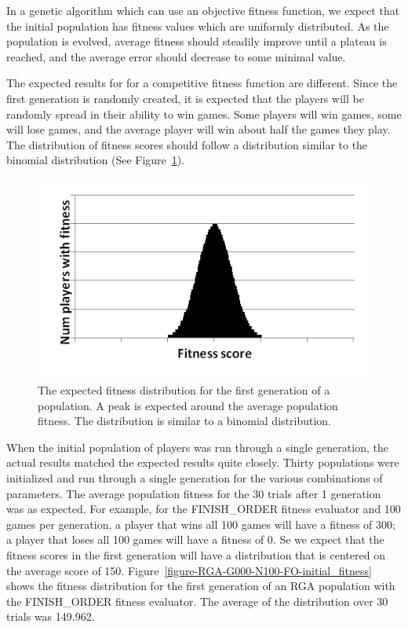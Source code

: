 In a genetic algorithm which can use an objective fitness function, we expect
that the initial population has fitness values which are uniformly distributed.
As the population is evolved, average fitness should steadily improve until a
plateau is reached, and the average error should decrease to some minimal
value.

The expected results for for a competitive fitness function are different. Since
the first generation is randomly created, it is expected that the players will
be randomly spread in their ability to win games. Some players will win games,
some will lose games, and the average player will win about half the games they
play. The distribution of fitness scores should follow a distribution similar to
the binomial distribution (See Figure~\ref{figure-binomial}).

\begin{figure}[htp]
\centerline{\includegraphics[width=1.0\columnwidth]{Figures/binomial.png}}
\caption[Binomial Distribution]{The expected fitness distribution for the first
generation of a population. A peak is expected around the average population
fitness. The distribution is similar to a binomial distribution.}
\label{figure-binomial}
\end{figure}

When the initial population of players was run through a single generation, the
actual results matched the expected results quite closely. Thirty populations
were initialized and run through a single generation for the various
combinations of parameters. The average population fitness for the 30 trials
after 1 generation was as expected. For example, for the FINISH\_ORDER fitness
evaluator and 100 games per generation, a player that wins all 100 games will
have a fitness of 300; a player that loses all 100 games will have a fitness of
0. Se we expect that the fitness scores in the first generation will have a
distribution that is centered on the average score of 150.
Figure~\ref{figure-RGA-G000-N100-FO-initial_fitness} shows the fitness
distribution for the first generation of an RGA population with the
FINISH\_ORDER fitness evaluator. The average of the distribution over 30 trials
was 149.962.

